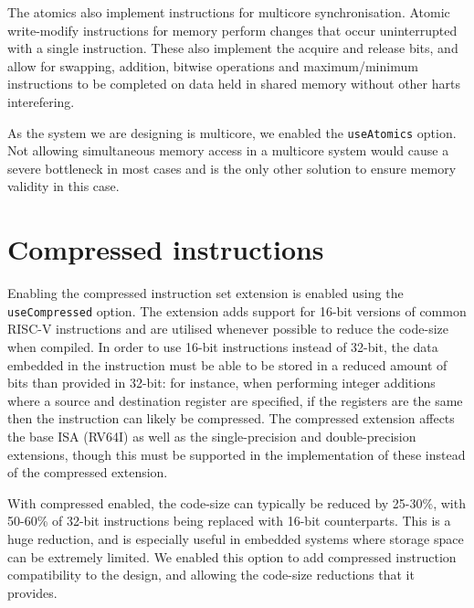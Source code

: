 The atomics also implement instructions for multicore synchronisation. Atomic write-modify instructions for memory perform changes that occur uninterrupted with a single instruction. These also implement the acquire and release bits, and allow for swapping, addition, bitwise operations and maximum/minimum instructions to be completed on data held in shared memory without other harts interefering.

As the system we are designing is multicore, we enabled the \texttt{useAtomics} option. Not allowing simultaneous memory access in a multicore system would cause a severe bottleneck in most cases and is the only other solution to ensure memory validity in this case.

\section{Compressed instructions}
Enabling the compressed instruction set extension is enabled using the \texttt{useCompressed} option. The extension adds support for 16-bit versions of common RISC-V instructions and are utilised whenever possible to reduce the code-size when compiled. In order to use 16-bit instructions instead of 32-bit, the data embedded in the instruction must be able to be stored in a reduced amount of bits than provided in 32-bit: for instance, when performing integer additions where a source and destination register are specified, if the registers are the same then the instruction can likely be compressed. The compressed extension affects the base ISA (RV64I) as well as the single-precision and double-precision extensions, though this must be supported in the implementation of these instead of the compressed extension.

With compressed enabled, the code-size can typically be reduced by 25-30\%, with 50-60\% of 32-bit instructions being replaced with 16-bit counterparts. This is a huge reduction, and is especially useful in embedded systems where storage space can be extremely limited. We enabled this option to add compressed instruction compatibility to the design, and allowing the code-size reductions that it provides.

